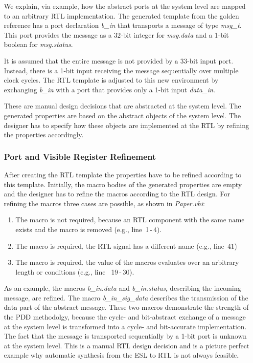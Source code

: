 We explain, via example, how the abstract ports at the system level are mapped to an arbitrary RTL implementation.
The generated template from the golden reference has a port declaration \textit{b\_in} that transports a message of type \textit{msg\_t}. 
This port provides the message as a 32-bit integer for \textit{msg.data} and a 1-bit boolean for \textit{msg.status}. 

It is assumed that the entire message is not provided by a 33-bit input port. 
Instead, there is a 1-bit input receiving the message sequentially over multiple clock cycles.
The RTL template is adjusted to this new environment by exchanging \textit{b\_in} with a port that provides only a 1-bit input \textit{data\_in}.

These are manual design decisions that are abstracted at the system level. 
The generated properties are based on the abstract objects of the system level. 
The designer has to specify how these objects are implemented at the RTL by refining the properties accordingly. 

\subsubsection{Port and Visible Register Refinement}

After creating the RTL template the properties have to be refined according to this template. 
Initially, the macro bodies of the generated properties are empty and the designer has to refine the macros according to the RTL design. 
For refining the macros three cases are possible, as shown in \textit{Paper.vhi}:
\newpage
\begin{enumerate}
\setlength\itemsep{0em}
\item The macro is not required, because an RTL component with the same name exists and the macro is removed (e.g., line~1\,-\,4). 
\item The macro is required, the RTL signal has a different name (e.g., line~41)
\item The macro is required, the value of the macros evaluates over an arbitrary length or conditions (e.g., line ~19\,-\,30). 
\end{enumerate}

As an example, the macros \textit{b\_in.data} and \textit{b\_in.status}, describing the incoming message, are refined. 
The macro \textit{b\_in\_sig\_data} describes the transmission of the data part of the abstract message. 
These two macros demonstrate the strength of the PDD methodolgy, because the cycle- and bit-abstract exchange of a message at the system level is transformed into a cycle- and bit-accurate implementation. 
The fact that the message is transported sequentially by a 1-bit port is unknown at the system level. 
This is a manual RTL design decision and is a picture perfect example why automatic synthesis from the ESL to RTL is not always feasible.
 
